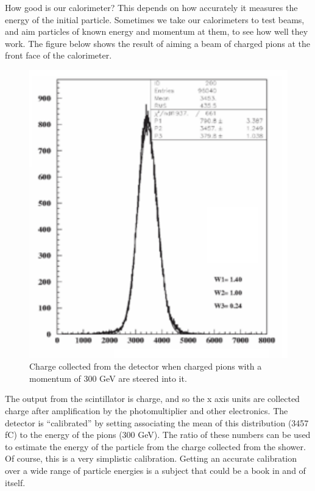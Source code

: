 \noindent
How good is our calorimeter? This depends on how accurately it measures the energy of the initial particle. Sometimes we take our calorimeters to test beams, and aim particles of known energy and momentum at them, to see how well they work. The figure below shows the result of aiming a beam of charged pions at the front face of the calorimeter.

\;
\;

\begin{figure}[h]
\centering\includegraphics[scale=0.5]{./calorimetry/Pictures/fig7.pdf}
\caption{Charge collected from the detector when charged pions with a momentum of 300 GeV are steered into it.}
\label{fig:pdgdedx}
\end{figure}

\;

\noindent
The output from the scintillator is charge, and so the x axis units are collected charge after amplification by the photomultiplier and other electronics. The detector is ``calibrated'' by setting associating the mean of this distribution (3457 fC) to the energy of the pions (300 GeV). The ratio of these numbers can be used to estimate the energy of the particle from the charge collected from the shower.  Of course, this is a very simplistic calibration. Getting an accurate calibration over a wide range of particle energies is a subject that could be a book in and of itself. 

